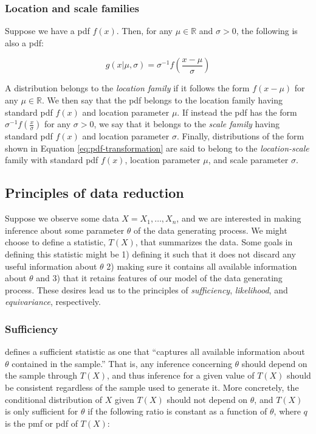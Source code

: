 \documentclass{report}
\begin{document}
\subsubsection{Location and scale families}

Suppose we have a \gls{pdf} $f(x)$. Then, for any $\mu \in \mathbb{R}$ and $\sigma > 0$, the following is also a \gls{pdf}:

\begin{equation}\label{eq:pdf-transformation}
    g(x | \mu, \sigma) = \sigma^{-1} f\left(\frac{x - \mu}{\sigma}\right)
\end{equation}

A distribution belongs to the \textit{location family} if it follows the form $f(x - \mu)$ for any $\mu \in \mathbb{R}$. We then say that the \gls{pdf} belongs to the location family having standard \gls{pdf} $f(x)$ and location parameter $\mu$. If instead the \gls{pdf} has the form $\sigma^{-1} f\left(\frac{x}{\sigma}\right)$ for any $\sigma > 0$, we say that it belongs to the \textit{scale family} having standard \gls{pdf} $f(x)$ and location parameter $\sigma$. Finally, distributions of the form shown in Equation \ref{eq:pdf-transformation} are said to belong to the \textit{location-scale} family with standard \gls{pdf} $f(x)$, location parameter $\mu$, and scale parameter $\sigma$. 

\subsection{Principles of data reduction}

Suppose we observe some data $X = X_1, \dots, X_n$, and we are interested in making inference about some parameter $\theta$ of the data generating process. We might choose to define a statistic, $T(X)$, that summarizes the data. Some goals in defining this statistic might be 1) defining it such that it does not discard any useful information about $\theta$ 2) making sure it contains all available information about $\theta$ and 3) that it retains features of our model of the data generating process. These desires lead us to the principles of \textit{sufficiency}, \textit{likelihood}, and \textit{equivariance}, respectively. 

\subsubsection{Sufficiency}

\cite[Chapter~6.2]{casella_statistical_2002} defines a sufficient statistic as one that ``captures all available information about $\theta$ contained in the sample.'' That is, any inference concerning $\theta$ should depend on the sample through $T(X)$, and thus inference for a given value of $T(X)$ should be consistent regardless of the sample used to generate it. More concretely, the conditional distribution of $X$ given $T(X)$ should not depend on $\theta$, and $T(X)$ is only sufficient for $\theta$ if the following ratio is constant as a function of $\theta$, where $q$ is the \gls{pmf} or \gls{pdf} of $T(X)$:
\end{document}

